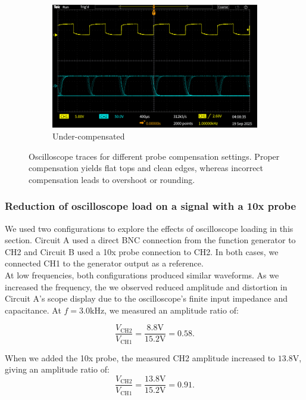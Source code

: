 \documentclass{article}
\begin{document}
\begin{figure}[H]
\begin{subfigure}[t]{0.32\textwidth}
        \includegraphics[width=\linewidth]{4.1a.side2.png}
        \caption{Under-compensated}
        \label{fig:under}
    \end{subfigure}
    \caption{Oscilloscope traces for different probe compensation settings. 
    Proper compensation yields flat tops and clean edges, whereas incorrect 
    compensation leads to overshoot or rounding.}
    \label{fig:compensation_all}
\end{figure}


\subsubsection{Reduction of oscilloscope load on a signal with a 10x probe}

We used two configurations to explore the effects of oscilloscope loading in
this section. Circuit A used a direct BNC connection from the function generator
to CH2 and Circuit B used a 10x probe connection to CH2. In both cases, we
connected CH1 to the generator output as a reference.\\

\noindent At low frequencies, both configurations produced similar waveforms. As we
increased the frequency, the we observed reduced amplitude and distortion in
Circuit A's scope display due to the oscilloscope's finite input impedance and
capacitance. At $f=3.0\si{\kilo\hertz}$, we measured an amplitude ratio of:

\begin{equation}
    \frac{V_{\text{CH2}}}{V_{\text{CH1}}}=\frac{8.8\si{\volt}}{15.2\si{\volt}}=0.58.
\end{equation}

\noindent When we added the 10x probe, the measured CH2 amplitude increased to $13.8\si{\volt}$,
giving an amplitude ratio of:
\begin{equation}
    \frac{V_{\text{CH2}}}{V_{\text{CH1}}}=\frac{13.8\si{\volt}}{15.2\si{\volt}}=0.91.
\end{equation}
\end{document}
